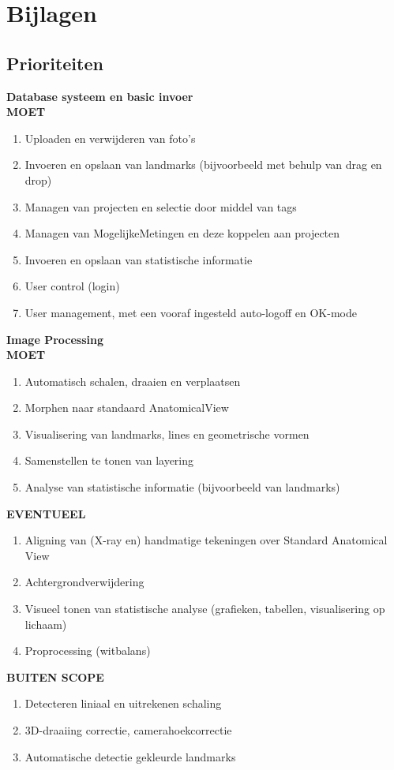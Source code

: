 \section{Bijlagen}
\label{Bijlagen}

\subsection{Prioriteiten}
\Large{\textbf{Database systeem en basic invoer}}\\
\large{\textbf{MOET}}
\begin{enumerate}
	\item Uploaden en verwijderen van foto's
	\item Invoeren en opslaan van landmarks (bijvoorbeeld met behulp van drag en drop)
	\item Managen van projecten en selectie door middel van tags
	\item Managen van MogelijkeMetingen en deze koppelen aan projecten
	\item Invoeren en opslaan van statistische informatie
	\item User control (login)
	\item User management, met een vooraf ingesteld auto-logoff en OK-mode
\end{enumerate}
\Large{\textbf{Image Processing}}\\
\large{\textbf{MOET}}
\begin{enumerate}
	\item Automatisch schalen, draaien en verplaatsen
	\item Morphen naar standaard AnatomicalView
	\item Visualisering van landmarks, lines en geometrische vormen
	\item Samenstellen te tonen van layering
	\item Analyse van statistische informatie (bijvoorbeeld van landmarks)
\end{enumerate}
\large{\textbf{EVENTUEEL}}
\begin{enumerate}
	\item Aligning van (X-ray en) handmatige tekeningen over Standard Anatomical View
	\item Achtergrondverwijdering
	\item Visueel tonen van statistische analyse (grafieken, tabellen, visualisering op lichaam)
	\item Proprocessing (witbalans)
\end{enumerate}
\large{\textbf{BUITEN SCOPE}}
\begin{enumerate}
	\item Detecteren liniaal en uitrekenen schaling
	\item 3D-draaiing correctie, camerahoekcorrectie
	\item Automatische detectie gekleurde landmarks
\end{enumerate}

